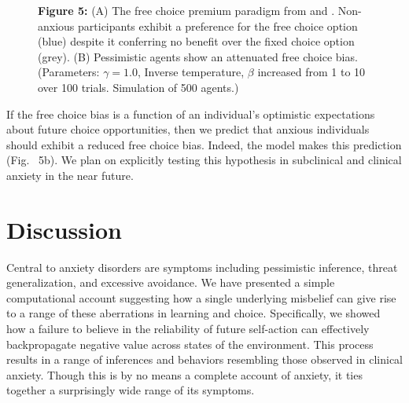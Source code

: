 \documentclass[11pt]{article} %
\begin{document}
\begin{figure}[!b]
  \centerline{%
  }
  \par \textbf{Figure 5:} (A) The free choice premium paradigm from \cite{Leotti2011} and \cite{Leotti2014}. Non-anxious participants exhibit a preference for the free choice option (blue) despite it conferring no benefit over the fixed choice option (grey). (B) Pessimistic agents show an attenuated free choice bias. (Parameters: $\gamma = 1.0$, Inverse temperature, $\beta$ increased from 1 to 10 over 100 trials. Simulation of 500 agents.)
\end{figure}

If the free choice bias is a function of an individual's optimistic expectations about future choice opportunities, then we predict that anxious individuals should exhibit a reduced free choice bias. Indeed, the model makes this prediction (Fig. ~5b). We plan on explicitly testing this hypothesis in subclinical and clinical anxiety in the near future.

\section{Discussion}

Central to anxiety disorders are symptoms including pessimistic inference, threat generalization, and excessive avoidance. We have presented a simple computational account suggesting how a single underlying misbelief can give rise to a range of these aberrations in learning and choice. Specifically, we showed how a failure to believe in the reliability of future self-action can effectively backpropagate negative value across states of the environment. This process results in a range of inferences and behaviors resembling those observed in clinical anxiety. Though this is by no means a complete account of anxiety, it ties together a surprisingly wide range of its symptoms.
\end{document}
